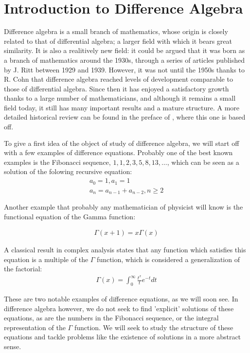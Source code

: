 \documentclass{article}
\theoremstyle{plain}
\theoremstyle{definition}
\begin{document}
\section{Introduction to Difference Algebra} 

Difference algebra is a small branch of mathematics, whose origin is closely related to that of differential algebra; a larger field with which it bears great similarity. It is also a realitively new field:
it could be argued that it was born as a branch of mathematics around the 1930s, through a series of articles published by J. Ritt between 1929 and 1939. However, it was not until the 1950s thanks to R. Cohn 
that difference algebra reached levels of development comparable to those of differential algebra.  Since then it has enjoyed a satisfactory growth thanks to a large number of mathematicians, and although it remains a small field today,
it still has many important results and a mature structure. A more detailed historical review can be found in the preface of \cite{1}, where this one is based off.


To give a first idea of the object of study of difference algebra, we will start off with a few examples of difference equations. Probably one of the best known examples is the Fibonacci sequence, $1,1,2,3,5,8,13,\ldots$, which can be seen as a solution of the folowing recursive equation:
\begin{align*}
a_0 = 1,  a_1 = 1 \\ a_n = a_{n-1} + a_{n-2}, n\geq 2
\end{align*}

Another example that probably any mathematician of physicist will know is the functional equation of the Gamma function:

\begin{align*}
\Gamma(x+1) = x \Gamma(x)
\end{align*}

A classical result in complex analysis states that any function which satisfies this equation is a multiple of the $\Gamma$ function,
which is considered a generalization of the factorial:
\begin{align*}
\Gamma(x) = \int_0^\infty{\frac{t^x}{t} e^{-t} dt}
\end{align*}

These are two notable examples of difference equations, as we will soon see. In difference algebra however, we do not seek to find 'explicit' solutions of these equations,
 as are the numbers in the Fibonacci sequence, or the integral representation of the $\Gamma$ function. We will seek to study the structure of these equations and tackle problems like the existence of solutions in a more abstract sense.
\end{document}

